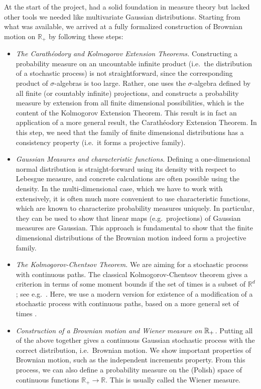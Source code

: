 \documentclass[lean]{Draft}
\begin{document}
At the start of the project, \mathlib had a solid foundation in measure theory but lacked other tools we needed like multivariate Gaussian distributions. Starting from what was available, we arrived at a fully formalized construction of Brownian motion on $\mathbb{R}_+$ by following these steps:
\begin{itemize}
\item {\em The Carathéodory and Kolmogorov Extension Theorems.} Constructing a probability measure on an uncountable infinite product (i.e.\ the distribution of a stochastic process) is not straightforward, since the corresponding product of $\sigma$-algebras is too large.
Rather, one uses the $\sigma$-algebra defined by all finite (or countably infinite) projections, and constructs a probability measure by extension from all finite dimensional possibilities, which is the content of the Kolmogorov Extension Theorem. This result is in fact an application of a more general result, the Carathéodory Extension Theorem. In this step, we need that the family of finite dimensional distributions has a consistency property (i.e.\ it forms a projective family).
\item {\em Gaussian Measures and characteristic functions.} Defining a one-dimensional normal distribution is straight-forward using its density with respect to Lebesgue measure, and concrete calculations are often possible using the density. In the multi-dimensional case, which we have to work with extensively, it is often much more convenient to use characteristic functions, which are known to characterize probability measures uniquely.
In particular, they can be used to show that linear maps (e.g.\ projections) of Gaussian measures are Gaussian. This approach is fundamental to show that the finite dimensional distributions of the Brownian motion indeed form a projective family.
\item {\em The Kolmogorov-Chentsov Theorem.} We are aiming for a stochastic process with continuous paths. The classical Kolmogorov-Chentsov theorem gives a criterion in terms of some moment bounds if the set of times is a subset of $\mathbb R^d$; see e.g.\ \cite{kallenberg2021}. Here, we use a modern version for existence of a modification of a stochastic process with continuous paths, based on a more general set of times \cite{kratschmer2023kolmogorov}.
\item {\em Construction of a Brownian motion and Wiener measure on $\mathbb{R}_+$.} Putting all of the above together gives a continuous Gaussian stochastic process with the correct distribution, i.e.\ Brownian motion.
We show important properties of Brownian motion, such as the independent increments property.
From this process, we can also define a probability measure on the (Polish) space of continuous functions $\mathbb R_+ \to \mathbb R$. This is usually called the Wiener measure.
\end{itemize}
\end{document}
